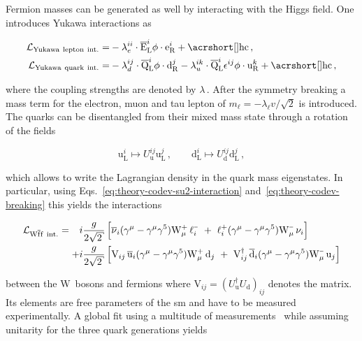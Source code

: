 Fermion masses can be generated as well by interacting with the Higgs field. One introduces Yukawa interactions as

\begin{subequations}
\begin{align}
\mathcal{L}_\mathrm{Yukawa~lepton~int.}=&-\lambda_{e}^{ii}\cdot\bar{\mathrm{E}}^{i}_\mathrm{L}\phi\cdot\mathrm{e}^{i}_\mathrm{R}+\mathrm{\gls{hc}}\,, \label{eq:theory-lepton-yukawa}\\
\mathcal{L}_\mathrm{Yukawa~quark~int.}=&-\lambda_{d}^{ij}\cdot\bar{\mathrm{Q}}^{i}_\mathrm{L}\phi\cdot\mathrm{d}^{j}_\mathrm{R}-\lambda_{u}^{ik}\cdot\bar{\mathrm{Q}}^{i}_\mathrm{L}\epsilon^{ij}\phi\cdot\mathrm{u}^{k}_\mathrm{R} +\mathrm{\gls{hc}}\,, \label{eq:theory-quark-yukawa}
\end{align}
\end{subequations}

where the coupling strengths are denoted by $\lambda\,$. After the symmetry breaking a mass term for the electron, muon and tau lepton of $m_\ell=-\lambda_\ell v/\sqrt{2}$ is introduced. The quarks can be disentangled from their mixed mass state through a rotation of the fields 

\begin{equation}
\mathrm{u}^{i}_\mathrm{L}\mapsto U^{ij}_\mathrm{u}\mathrm{u}^{j}_\mathrm{L}\,,\qquad \mathrm{d}^{i}_\mathrm{L}\mapsto U^{ij}_\mathrm{d}\mathrm{d}^{j}_\mathrm{L}\,,
\end{equation}

which allows to write the Lagrangian density in the quark mass eigenstates. In particular, using Eqs.~\ref{eq:theory-codev-su2-interaction} and~\ref{eq:theory-codev-breaking} this yields the interactions

\begin{align}
\mathcal{L}_{\mathrm{W}\bar{\mathrm{f}}\mathrm{f}~\mathrm{int.}}=\hphantom{+}i&\frac{g}{2\sqrt{2}}\,\Big[\bar{\nu}_{i}(\gamma^\mu-\gamma^\mu\gamma^5) \mathrm{W}^{\rmplus}_\mu\,\ell^{\rmminus}_{i}~+~{\ell}^{\rmplus}_{i}(\gamma^\mu-\gamma^\mu\gamma^5) \mathrm{W}^{\rmminus}_\mu\,\nu_{i}\Big]\nonumber\\
+i&\frac{g}{2\sqrt{2}}\,\Big[\mathrm{V}_{ij}\,\bar{\mathrm{u}}_{i}(\gamma^\mu-\gamma^\mu\gamma^5) \mathrm{W}^{\rmplus}_\mu\,\mathrm{d}_{j}~+~\mathrm{V}_{ij}^\dagger\,\bar{\mathrm{d}}_{i}(\gamma^\mu-\gamma^\mu\gamma^5) \mathrm{W}^{\rmminus}_\mu\,\mathrm{u}_{j}\Big] \label{eq:theory-qqW-int}
\end{align}

between the $\mathrm{W}$~bosons and fermions where $\mathrm{V}_{ij}=(U^\dagger_\mathrm{u}U_\mathrm{d})_{ij}$ denotes the  matrix. Its elements are free parameters of the \gls{sm} and have to be measured experimentally. A global fit using a multitude of measurements~\cite{Olive:2016xmw} while assuming unitarity for the three quark generations yields

